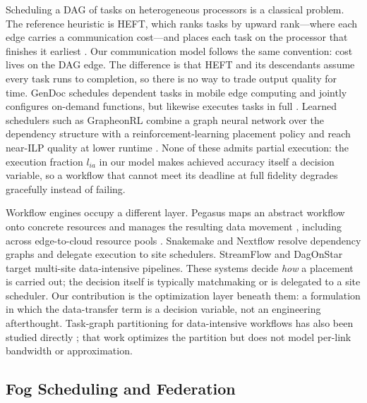 \documentclass[conference]{IEEEtran}
\begin{document}
Scheduling a DAG of tasks on heterogeneous processors is a classical problem. The reference heuristic is HEFT, which ranks tasks by upward rank---where each edge carries a communication cost---and places each task on the processor that finishes it earliest \cite{topcuoglu2002heft}. Our communication model follows the same convention: cost lives on the DAG edge. The difference is that HEFT and its descendants assume every task runs to completion, so there is no way to trade output quality for time. GenDoc schedules dependent tasks in mobile edge computing and jointly configures on-demand functions, but likewise executes tasks in full \cite{li2023dagmec}. Learned schedulers such as GrapheonRL combine a graph neural network over the dependency structure with a reinforcement-learning placement policy and reach near-ILP quality at lower runtime \cite{sharma2025grapheonrl}. None of these admits partial execution: the execution fraction $l_{ia}$ in our model makes achieved accuracy itself a decision variable, so a workflow that cannot meet its deadline at full fidelity degrades gracefully instead of failing.

Workflow engines occupy a different layer. Pegasus maps an abstract workflow onto concrete resources and manages the resulting data movement \cite{deelman2015pegasus}, including across edge-to-cloud resource pools \cite{tanaka2022pegasusedge}. Snakemake \cite{koster2012snakemake} and Nextflow \cite{ditommaso2017nextflow} resolve dependency graphs and delegate execution to site schedulers. StreamFlow \cite{colonnelli2021streamflow} and DagOnStar \cite{sanchezgallegos2021dagonstar,perrotta2025streaming} target multi-site data-intensive pipelines. These systems decide \emph{how} a placement is carried out; the decision itself is typically matchmaking or is delegated to a site scheduler. Our contribution is the optimization layer beneath them: a formulation in which the data-transfer term is a decision variable, not an engineering afterthought. Task-graph partitioning for data-intensive workflows has also been studied directly \cite{ahmad2014workflow}; that work optimizes the partition but does not model per-link bandwidth or approximation.

\subsection{Fog Scheduling and Federation}
\end{document}
